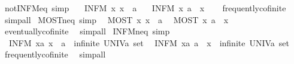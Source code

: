 \begin{isabellebody}
\begin{isamarkuptext}
\end{isamarkuptext}\isamarkuptrue%
\isamarkupfalse%
\ not{\isacharunderscore}INFM{\isacharunderscore}eq\ {\isacharbrackleft}simp{\isacharbrackright}{\isacharcolon}\isanewline
\ \ {\isachardoublequoteopen}{\isasymnot}\ {\isacharparenleft}INFM\ x{\isachardot}\ x\ {\isacharequal}\ a{\isacharparenright}{\isachardoublequoteclose}\isanewline
\ \ {\isachardoublequoteopen}{\isasymnot}\ {\isacharparenleft}INFM\ x{\isachardot}\ a\ {\isacharequal}\ x{\isacharparenright}{\isachardoublequoteclose}\isanewline
%
\isadelimproof
\ \ %
\endisadelimproof
%
\isatagproof
{}\isamarkupfalse%
\ frequently{\isacharunderscore}cofinite\ \isamarkupfalse%
\ simp{\isacharunderscore}all%
\endisatagproof
{\isafoldproof}%
%
\isadelimproof
\isanewline
%
\endisadelimproof
\isanewline
{}\isamarkupfalse%
\ MOST{\isacharunderscore}neq\ {\isacharbrackleft}simp{\isacharbrackright}{\isacharcolon}\isanewline
\ \ {\isachardoublequoteopen}MOST\ x{\isachardot}\ x\ {\isasymnoteq}\ a{\isachardoublequoteclose}\isanewline
\ \ {\isachardoublequoteopen}MOST\ x{\isachardot}\ a\ {\isasymnoteq}\ x{\isachardoublequoteclose}\isanewline
%
\isadelimproof
\ \ %
\endisadelimproof
%
\isatagproof
{}\isamarkupfalse%
\ eventually{\isacharunderscore}cofinite\ \isamarkupfalse%
\ simp{\isacharunderscore}all%
\endisatagproof
{\isafoldproof}%
%
\isadelimproof
\isanewline
%
\endisadelimproof
\isanewline
{}\isamarkupfalse%
\ INFM{\isacharunderscore}neq\ {\isacharbrackleft}simp{\isacharbrackright}{\isacharcolon}\isanewline
\ \ {\isachardoublequoteopen}{\isacharparenleft}INFM\ x{\isacharcolon}{\isacharcolon}{\isacharprime}a{\isachardot}\ x\ {\isasymnoteq}\ a{\isacharparenright}\ {\isasymlongleftrightarrow}\ infinite\ {\isacharparenleft}UNIV{\isacharcolon}{\isacharcolon}{\isacharprime}a\ set{\isacharparenright}{\isachardoublequoteclose}\isanewline
\ \ {\isachardoublequoteopen}{\isacharparenleft}INFM\ x{\isacharcolon}{\isacharcolon}{\isacharprime}a{\isachardot}\ a\ {\isasymnoteq}\ x{\isacharparenright}\ {\isasymlongleftrightarrow}\ infinite\ {\isacharparenleft}UNIV{\isacharcolon}{\isacharcolon}{\isacharprime}a\ set{\isacharparenright}{\isachardoublequoteclose}\isanewline
%
\isadelimproof
\ \ %
\endisadelimproof
%
\isatagproof
{}\isamarkupfalse%
\ frequently{\isacharunderscore}cofinite\ \isamarkupfalse%
\ simp{\isacharunderscore}all%
\endisatagproof
{\isafoldproof}%
%
\isadelimproof
\isanewline
%
\endisadelimproof
\isanewline
{}\isamarkupfalse%

\end{isabellebody}
